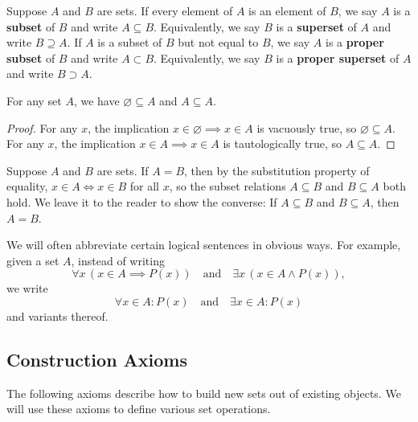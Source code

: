 \begin{definition}
	Suppose $A$ and $B$ are sets.
	If every element of $A$ is an element of $B$, we say $A$ is a \textbf{subset} of $B$ and write $A\subseteq B$.
	Equivalently, we say $B$ is a \textbf{superset} of $A$ and write $B\supseteq A$.
	If $A$ is a subset of $B$ but not equal to $B$, we say $A$ is a \textbf{proper subset} of $B$ and write $A\subset B$.
	Equivalently, we say $B$ is a \textbf{proper superset} of $A$ and write $B\supset A$.
\end{definition}

\begin{prop}
	For any set $A$, we have $\varnothing\subseteq A$ and $A\subseteq A$. 
\end{prop}
\begin{proof}
	For any $x$, the implication $x\in\varnothing \implies x\in A$ is vacuously true, so $\varnothing\subseteq A$.
	For any $x$, the implication $x\in A \implies x\in A$ is tautologically true, so $A\subseteq A$.
\end{proof}

Suppose $A$ and $B$ are sets.
If $A = B$, then by the substitution property of equality, $x\in A\iff x\in B$ for all $x$, so the subset relations $A\subseteq B$ and $B\subseteq A$ both hold.
We leave it to the reader to show the converse: 
If $A\subseteq B$ and $B\subseteq A$, then $A = B$. 

We will often abbreviate certain logical sentences in obvious ways.
For example, given a set $A$, instead of writing
\[ \forall x\, (x\in A\implies P(x)) \quad\text{and}\quad \exists x\, (x\in A\land P(x)), \]
we write
\[ \forall x\in A : P(x) \quad\text{and}\quad \exists x\in A : P(x) \]
and variants thereof.

\subsection{Construction Axioms}

The following axioms describe how to build new sets out of existing objects.
We will use these axioms to define various set operations.  

